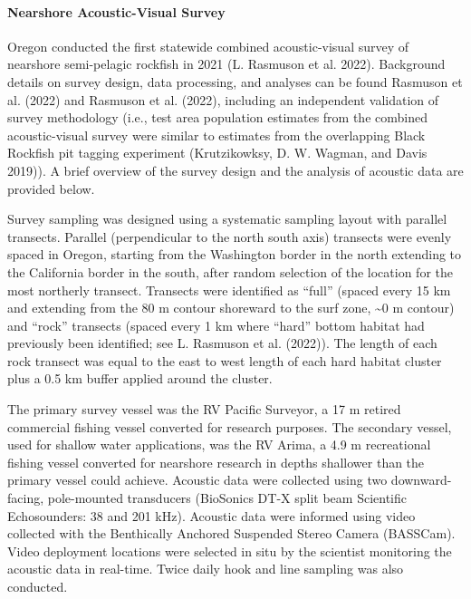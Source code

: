 \documentclass[11pt,
  english,
  letterpaper,
]{article}
\begin{document}
\hypertarget{nearshore-acoustic-visual-survey}{%
\paragraph{Nearshore Acoustic-Visual Survey}\label{nearshore-acoustic-visual-survey}}

Oregon conducted the first statewide combined acoustic-visual survey of nearshore semi-pelagic rockfish in 2021 (L. Rasmuson et al. 2022). Background details on survey design, data processing, and analyses can be found Rasmuson et al. (2022) and Rasmuson et al. (2022), including an independent validation of survey methodology (i.e., test area population estimates from the combined acoustic-visual survey were similar to estimates from the overlapping Black Rockfish pit tagging experiment (Krutzikowksy, D. W. Wagman, and Davis 2019)). A brief overview of the survey design and the analysis of acoustic data are provided below.

Survey sampling was designed using a systematic sampling layout with parallel transects. Parallel (perpendicular to the north south axis) transects were evenly spaced in Oregon, starting from the Washington border in the north extending to the California border in the south, after random selection of the location for the most northerly transect. Transects were identified as ``full'' (spaced every 15 km and extending from the 80 m contour shoreward to the surf zone, \textasciitilde0 m contour) and ``rock'' transects (spaced every 1 km where ``hard'' bottom habitat had previously been identified; see L. Rasmuson et al. (2022)). The length of each rock transect was equal to the east to west length of each hard habitat cluster plus a 0.5 km buffer applied around the cluster.

The primary survey vessel was the RV Pacific Surveyor, a 17 m retired commercial fishing vessel converted for research purposes. The secondary vessel, used for shallow water applications, was the RV Arima, a 4.9 m recreational fishing vessel converted for nearshore research in depths shallower than the primary vessel could achieve. Acoustic data were collected using two downward-facing, pole-mounted transducers (BioSonics DT-X split beam Scientific Echosounders: 38 and 201 kHz). Acoustic data were informed using video collected with the Benthically Anchored Suspended Stereo Camera (BASSCam). Video deployment locations were selected in situ by the scientist monitoring the acoustic data in real-time. Twice daily hook and line sampling was also conducted.
\end{document}
